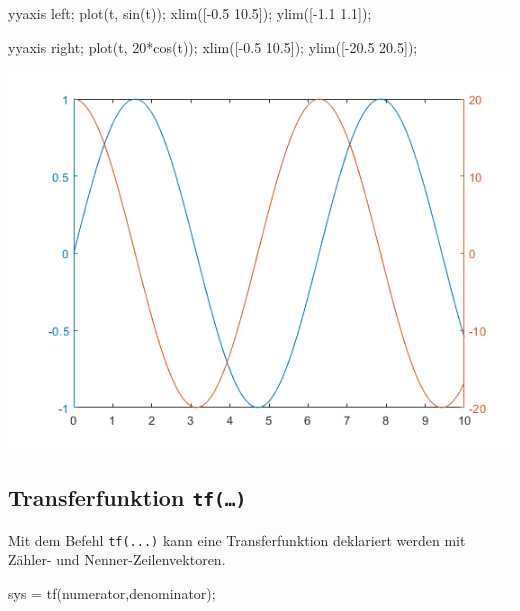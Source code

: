 \documentclass[
  10pt,
  a4paper,
  german]{article}
\newenvironment{Shaded}{}{}
\newcommand{\FloatTok}[1]{\textcolor[rgb]{0.00,0.36,0.77}{#1}}
\newcommand{\NormalTok}[1]{\textcolor[rgb]{0.14,0.16,0.18}{#1}}
\newcommand{\OperatorTok}[1]{\textcolor[rgb]{0.14,0.16,0.18}{#1}}
\newcommand{\VariableTok}[1]{\textcolor[rgb]{0.89,0.38,0.04}{#1}}
\numberwithin{equation}{section}
\begin{document}
\begin{multicols}{2}
\begin{Shaded}
\begin{Highlighting}[]
\VariableTok{yyaxis} \VariableTok{left}\OperatorTok{;}
\VariableTok{plot}\NormalTok{(}\VariableTok{t}\OperatorTok{,} \VariableTok{sin}\NormalTok{(}\VariableTok{t}\NormalTok{))}\OperatorTok{;}
\VariableTok{xlim}\NormalTok{([}\OperatorTok{{-}}\FloatTok{0.5} \FloatTok{10.5}\NormalTok{])}\OperatorTok{;}
\VariableTok{ylim}\NormalTok{([}\OperatorTok{{-}}\FloatTok{1.1} \FloatTok{1.1}\NormalTok{])}\OperatorTok{;}

\VariableTok{yyaxis} \VariableTok{right}\OperatorTok{;}
\VariableTok{plot}\NormalTok{(}\VariableTok{t}\OperatorTok{,} \FloatTok{20}\OperatorTok{*}\VariableTok{cos}\NormalTok{(}\VariableTok{t}\NormalTok{))}\OperatorTok{;}
\VariableTok{xlim}\NormalTok{([}\OperatorTok{{-}}\FloatTok{0.5} \FloatTok{10.5}\NormalTok{])}\OperatorTok{;}
\VariableTok{ylim}\NormalTok{([}\OperatorTok{{-}}\FloatTok{20.5} \FloatTok{20.5}\NormalTok{])}\OperatorTok{;}
\end{Highlighting}
\end{Shaded}

\includegraphics{images/plotyy.png}

\hypertarget{transferfunktion-tf}{%
\subsection{\texorpdfstring{Transferfunktion
\texttt{tf(…)}}{Transferfunktion tf(\ldots)}}\label{transferfunktion-tf}}

Mit dem Befehl \texttt{tf(...)} kann eine Transferfunktion deklariert
werden mit Zähler- und Nenner-Zeilenvektoren.

\begin{Shaded}
\begin{Highlighting}[]
\VariableTok{sys} \OperatorTok{=} \VariableTok{tf}\NormalTok{(}\VariableTok{numerator}\OperatorTok{,}\VariableTok{denominator}\NormalTok{)}\OperatorTok{;}
\end{Highlighting}
\end{Shaded}


\end{multicols}
\end{document}
